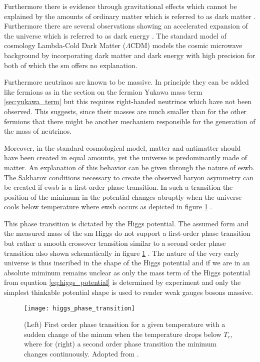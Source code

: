 Furthermore there is evidence through gravitational effects which cannot be explained by the amounts of ordinary matter which is referred to as dark matter \citep{dark_matter_a_primer}. Furthermore there are several observations showing an accelerated expansion of the universe which is referred to as dark energy \citep{RevModPhys.75.559}. The standard model of cosmology Lambda-Cold Dark Matter ($\Lambda$CDM) \citep{planck2020} models the cosmic microwave background by incorporating dark matter and dark energy with high precision for both of which the \ac{sm} offers no explanation.

Furthermore neutrinos are known to be massive. In principle they can be added like fermions as in the section on the fermion Yukawa mass term \ref{sec:yukawa_term} but this requires right-handed neutrinos which have not been observed. This suggests, since their masses are much smaller than for the other fermions that there might be another mechanism responsible for the generation of the mass of neutrinos.

Moreover, in the standard cosmological model, matter and antimatter should have been created in equal amounts, yet the universe is predominantly made of matter. An explanation of this behavior can be given through the nature of \ac{eswb}. The Sakharov conditions necessary to create the observed baryon asymmetry can be created if \ac{ewsb} is a first order phase transition. In such a transition the position of the minimum in the potential changes abruptly when the universe cools below temperature where \ac{ewsb} occurs as depicted in figure \ref{fig:higgs_phase_transition} \citep{Banerjee2011ElectroweakPT,MICCO2020100045}. 

This phase transition is dictated by the Higgs potential. The assumed form and the measured mass of the \ac{sm} Higgs do not support a first-order phase transition but rather a smooth crossover transition similar to a second order phase transition also shown schematically in figure \ref{fig:higgs_phase_transition} \citep{PhysRevD.105.095041,MICCO2020100045}. The nature of the very early universe is thus inscribed in the shape of the Higgs potential and if we are in an absolute miminum remains unclear as only the mass term of the Higgs potential from equation \ref{eq:higgs_potential} is determined by experiment and only the simplest thinkable potential shape is used to render weak gauges bosons massive. 

\begin{figure}
    \centering
    \texttt{[image: higgs\_phase\_transition]}
    \caption[]{(Left) First order phase transition for a given temperature with a sudden change of the minum when the temperature drops below $T_c$, where for (right) a second order phase transition the minimum changes continuously. Adopted from \citep{Banerjee2011ElectroweakPT}.}
    \label{fig:higgs_phase_transition}
\end{figure}

